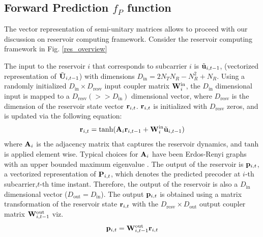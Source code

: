 \documentclass[conference]{IEEEtran}
\begin{document}
\subsection{Forward Prediction $f_P$ function}
\noindent The vector representation of semi-unitary matrices allows to proceed with our discussion on reservoir computing framework.
Consider the reservoir computing framework in Fig. \ref{res_overview} %

The input to the reservoir $i$ that corresponds to subcarrier $i$ is $\tilde{{\bf u}}_{i,t-1}$, (vectorized representation of $\tilde{{\bf U}}_{i,t-1}$) with dimensions $D_{\text{in}}=2N_TN_R-N_R^2+N_R$.
Using a randomly initialized $D_{\text{in}}\times D_{\text{resv}}$ input coupler matrix ${\bf W}^{\text{in}}_i$, the $D_{\text{in}}$ dimensional input is mapped to a $D_{\text{resv}}(>>D_{\text{in}})$ dimensional vector, where $D_{\text{resv}}$ is the dimension of the reservoir state vector ${\bf r}_{i,t}$. ${\bf r}_{i,t}$ is initialized with $D_{\text{resv}}$ zeros, and is updated via the following equation:
\begin{equation}
\br_{i,t}=\text{tanh}(\bA_i\br_{i,t-1}+\bW^{\text{in}}_i\tilde{\bu}_{i,t-1})
\label{res_upd}
\end{equation}
where ${\bf A}_i$ is the adjacency matrix that captures the reservoir dynamics, and $\text{tanh}$ is applied element wise.
Typical choices for ${\bf A}_i$ have been Erdos-Renyi graphs with an upper bounded maximum eigenvalue \cite{mosleh2017brain,pathak2017using}. The output of the reservoir is ${\bf p}_{i,t}$, a vectorized representation of ${\bf P}_{i,t}$, which denotes the predicted precoder at $i$-th subcarrier,$t$-th time instant.
Therefore, the output of the reservoir is also a $D_{\text{in}}$ dimensional vector ($D_{\text{out}}=D_{\text{in}}$).
The output ${\bf p}_{i,t}$ is obtained using a matrix transformation of the reservoir state ${\bf r}_{i,t}$ with the $D_{\text{resv}}\times D_{\text{out}}$ output coupler matrix ${\bf W}^{\text{out}}_{i,t-1}$ viz.
\begin{equation}
\bp_{i,t}=\bW^{\text{out}}_{i,t-1}\br_{i,t}
\label{pred_op}
\end{equation}
\end{document}
